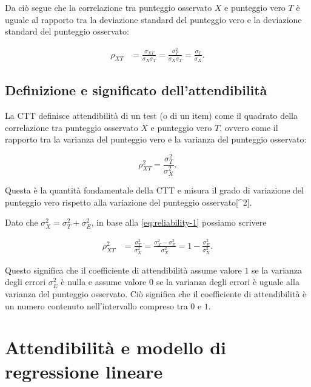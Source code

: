 \documentclass[
  11pt,
]{krantz}
\theoremstyle{definition}
\theoremstyle{definition}
\theoremstyle{definition}
\theoremstyle{definition}
\theoremstyle{remark}
\begin{document}
Da ciò segue che la correlazione tra punteggio osservato \(X\) e punteggio vero \(T\) è uguale al rapporto tra la deviazione standard del punteggio vero e la deviazione standard del punteggio osservato:

\begin{equation}
\begin{aligned}
\rho_{XT} &= \frac{\sigma_{XT}}{\sigma_X \sigma_T} = \frac{\sigma^2_{T}}{\sigma_X \sigma_T} = \frac{\sigma_{T}}{\sigma_X}.
\label{eq:sd-ratio}
\end{aligned}
\end{equation}

\hypertarget{definizione-e-significato-dellattendibilituxe0}{%
\subsection{Definizione e significato dell'attendibilità}\label{definizione-e-significato-dellattendibilituxe0}}

La CTT definisce attendibilità di un test (o di un item) come il quadrato della correlazione tra punteggio osservato \(X\) e punteggio vero \(T\), ovvero come il rapporto tra la varianza del punteggio vero e la varianza del punteggio osservato:

\[
\rho_{XT}^2 = \frac{\sigma_{T}^2}{\sigma_X^2}.
\label{eq:reliability-1}
\]

Questa è la quantità fondamentale della CTT e misura il grado di variazione del punteggio vero rispetto alla variazione del punteggio osservato{[}\^{}2{]}.

Dato che \(\sigma^2_X = \sigma_T^2 + \sigma_E^2\), in base alla \eqref{eq:reliability-1} possiamo scrivere

\begin{equation}
\begin{aligned}
\rho_{XT}^2 &= \frac{\sigma_{T}^2}{\sigma_X^2} =\frac{\sigma_{X}^2 - \sigma^2_E}{\sigma_X^2}
 = 1-\frac{\sigma_{E}^2}{\sigma_X^2}.
 \label{eq:3-2-6}
\end{aligned}
\end{equation}

Questo significa che il coefficiente di attendibilità assume valore \(1\) se la varianza degli errori \(\sigma_{E}^2\) è nulla e assume valore \(0\) se la varianza degli errori è uguale alla varianza del punteggio osservato. Ciò significa che il coefficiente di attendibilità è un numero contenuto nell'intervallo compreso tra \(0\) e \(1\).

\hypertarget{attendibilituxe0-e-modello-di-regressione-lineare}{%
\section{Attendibilità e modello di regressione lineare}\label{attendibilituxe0-e-modello-di-regressione-lineare}}
\end{document}
